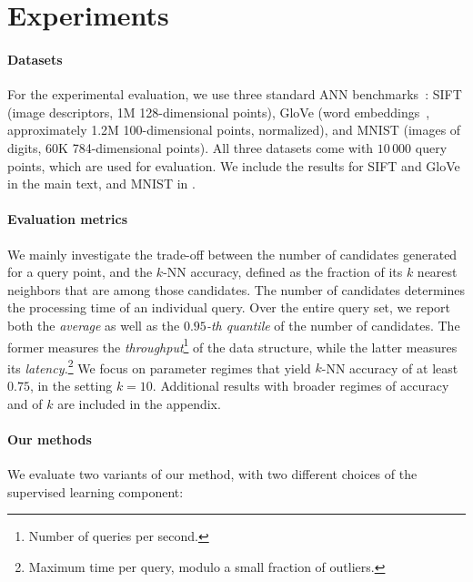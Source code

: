 \documentclass[11pt]{article}
\begin{document}
\section{Experiments}\label{piotr_sec:experiments}

\paragraph{Datasets}
For the experimental evaluation, we use three standard ANN benchmarks~\cite{aumuller2017ann}: SIFT (image descriptors, 1M 128-dimensional points), GloVe (word embeddings~\cite{pennington2014glove}, approximately 1.2M 100-dimensional points, normalized), and MNIST (images of digits, 60K 784-dimensional points).
All three datasets come with $10\,000$ query points, which are used for evaluation. 
We include the results for SIFT and GloVe in the main text, and MNIST in \cite{arxiv}.

\paragraph{Evaluation metrics}
We mainly investigate the trade-off between the number of candidates generated for a query point, and the $k$-NN accuracy, defined as the fraction of its $k$ nearest neighbors that are among those candidates.
The number of candidates determines the processing time of an individual query.
Over the entire query set, we report both the \emph{average}
as well as the \emph{$0.95$-th quantile} of the number of candidates.
The former measures the \emph{throughput}\footnote{Number of queries per second.} of the data structure, while the latter measures its \emph{latency.}\footnote{Maximum time per query, modulo a small fraction of outliers.}
We focus on parameter regimes that yield $k$-NN accuracy of at least $0.75$, in the setting $k=10$.
Additional results with broader regimes of accuracy and of $k$ are included in the appendix.

\paragraph{Our methods}
We evaluate two variants of our method, with two different choices of the supervised learning component:%
\end{document}
